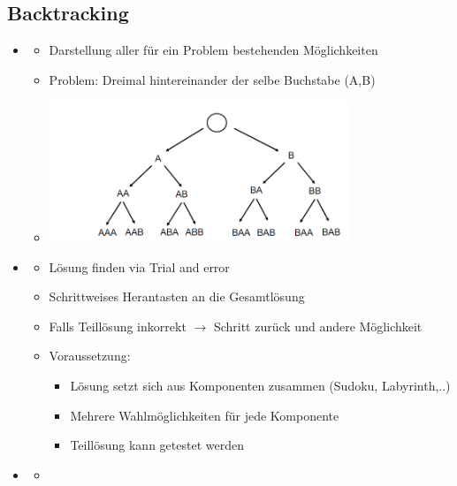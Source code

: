 \documentclass[
    12pt,
    a4paper,
    ngerman,
    color=3b,%
    marginpar=false,
    colorback=false,
    leqno,
]{tudaexercise}
\begin{document}
\subsection{Backtracking}
    \begin{itemize}
        \item {}
            \begin{itemize}
                \item Darstellung aller für ein Problem bestehenden Möglichkeiten
                \item Problem: Dreimal hintereinander der selbe Buchstabe (A,B)
                \item[] \includegraphics[width=9cm]{pictures/suchbaum.PNG}
            \end{itemize}
        \item {}
            \begin{itemize}
                \item Lösung finden via Trial and error
                \item Schrittweises Herantasten an die Gesamtlösung
                \item Falls Teillösung inkorrekt $\rightarrow$ Schritt zurück und andere Möglichkeit
                \item Voraussetzung:
                    \begin{itemize}
                        \item Lösung setzt sich aus Komponenten zusammen (Sudoku, Labyrinth,..)
                        \item Mehrere Wahlmöglichkeiten für jede Komponente
                        \item Teillösung kann getestet werden
                    \end{itemize}
            \end{itemize}
            \item {}
            \begin{itemize}
                \item[]

\end{itemize}
\end{itemize}
\end{document}
